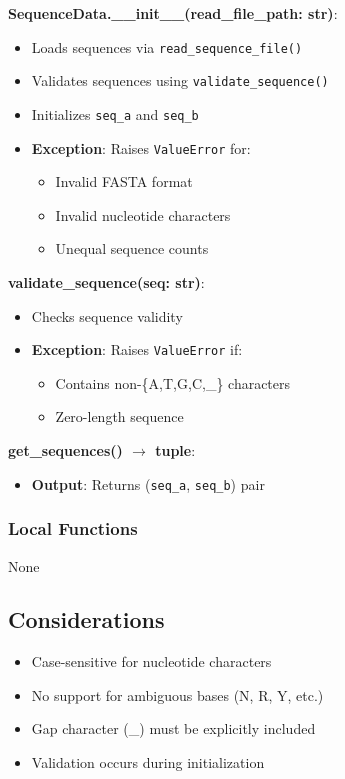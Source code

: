 \documentclass[12pt, titlepage]{article}
\begin{document}
\noindent \textbf{SequenceData.\_\_init\_\_(read\_file\_path: str)}:
\begin{itemize}
    \item Loads sequences via \texttt{read\_sequence\_file()}
    \item Validates sequences using \texttt{validate\_sequence()}
    \item Initializes \texttt{seq\_a} and \texttt{seq\_b}
    \item \textbf{Exception}: Raises \texttt{ValueError} for:
    \begin{itemize}
        \item Invalid FASTA format
        \item Invalid nucleotide characters
        \item Unequal sequence counts
    \end{itemize}
\end{itemize}

\noindent \textbf{validate\_sequence(seq: str)}:
\begin{itemize}
    \item Checks sequence validity
    \item \textbf{Exception}: Raises \texttt{ValueError} if:
    \begin{itemize}
        \item Contains non-\{A,T,G,C,\_\} characters
        \item Zero-length sequence
    \end{itemize}
\end{itemize}

\noindent \textbf{get\_sequences() $\rightarrow$ tuple}:
\begin{itemize}
    \item \textbf{Output}: Returns (\texttt{seq\_a}, \texttt{seq\_b}) pair
\end{itemize}

\subsubsection{Local Functions}

None

\subsection{Considerations}

\begin{itemize}
    \item Case-sensitive for nucleotide characters
    \item No support for ambiguous bases (N, R, Y, etc.)
    \item Gap character (\_) must be explicitly included
    \item Validation occurs during initialization
\end{itemize}
\end{document}
